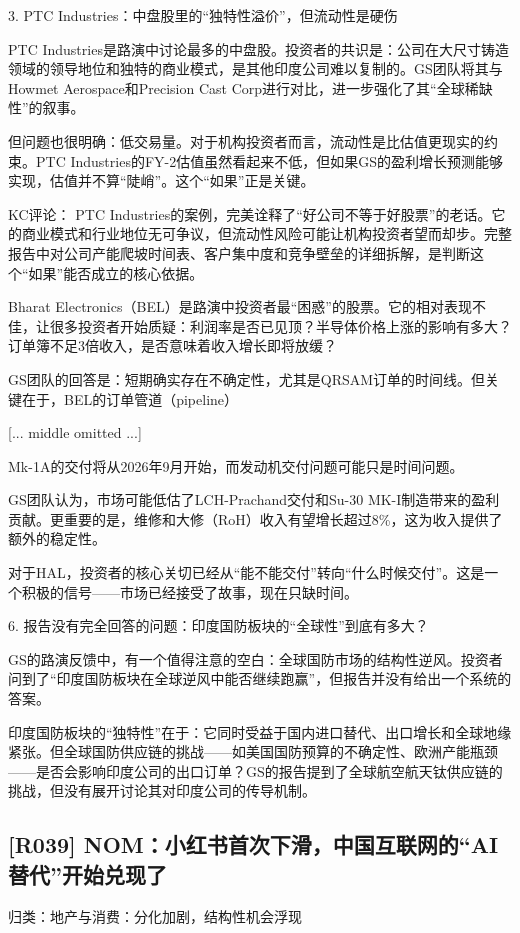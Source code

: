 \documentclass[11pt]{ctexart}
\begin{document}
3. PTC Industries：中盘股里的“独特性溢价”，但流动性是硬伤

PTC Industries是路演中讨论最多的中盘股。投资者的共识是：公司在大尺寸铸造领域的领导地位和独特的商业模式，是其他印度公司难以复制的。GS团队将其与Howmet Aerospace和Precision Cast Corp进行对比，进一步强化了其“全球稀缺性”的叙事。

但问题也很明确：低交易量。对于机构投资者而言，流动性是比估值更现实的约束。PTC Industries的FY-2估值虽然看起来不低，但如果GS的盈利增长预测能够实现，估值并不算“陡峭”。这个“如果”正是关键。

KC评论： PTC Industries的案例，完美诠释了“好公司不等于好股票”的老话。它的商业模式和行业地位无可争议，但流动性风险可能让机构投资者望而却步。完整报告中对公司产能爬坡时间表、客户集中度和竞争壁垒的详细拆解，是判断这个“如果”能否成立的核心依据。

Bharat Electronics（BEL）是路演中投资者最“困惑”的股票。它的相对表现不佳，让很多投资者开始质疑：利润率是否已见顶？半导体价格上涨的影响有多大？订单簿不足3倍收入，是否意味着收入增长即将放缓？

GS团队的回答是：短期确实存在不确定性，尤其是QRSAM订单的时间线。但关键在于，BEL的订单管道（pipeline）

[... middle omitted ...]

 Mk-1A的交付将从2026年9月开始，而发动机交付问题可能只是时间问题。

GS团队认为，市场可能低估了LCH-Prachand交付和Su-30 MK-I制造带来的盈利贡献。更重要的是，维修和大修（RoH）收入有望增长超过8\%，这为收入提供了额外的稳定性。

对于HAL，投资者的核心关切已经从“能不能交付”转向“什么时候交付”。这是一个积极的信号——市场已经接受了故事，现在只缺时间。

6. 报告没有完全回答的问题：印度国防板块的“全球性”到底有多大？

GS的路演反馈中，有一个值得注意的空白：全球国防市场的结构性逆风。投资者问到了“印度国防板块在全球逆风中能否继续跑赢”，但报告并没有给出一个系统的答案。

印度国防板块的“独特性”在于：它同时受益于国内进口替代、出口增长和全球地缘紧张。但全球国防供应链的挑战——如美国国防预算的不确定性、欧洲产能瓶颈——是否会影响印度公司的出口订单？GS的报告提到了全球航空航天钛供应链的挑战，但没有展开讨论其对印度公司的传导机制。

\subsection{[R039] NOM：小红书首次下滑，中国互联网的“AI替代”开始兑现了}
{\small\color{refgray}归类：地产与消费：分化加剧，结构性机会浮现}
\end{document}
